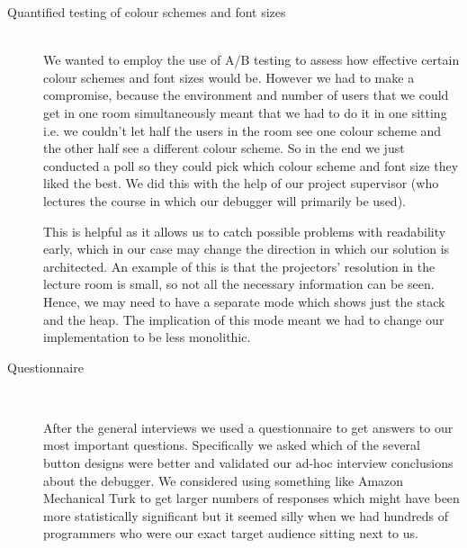 \documentclass[11pt, a4paper]{article}
\begin{document}
\begin{description}
\item[Quantified testing of colour schemes and font sizes] \hfill \\
We wanted to employ the use of A/B testing to assess how effective certain colour schemes and font sizes would be.
However we had to make a compromise, because the environment and number of users that we could get in one room simultaneously meant that we had to do it in one sitting i.e. we couldn’t let half the users in the room see one colour scheme and the other half see a different colour scheme.
So in the end we just conducted a poll so they could pick which colour scheme and font size they liked the best.
We did this with the help of our project supervisor (who lectures the course in which our debugger will primarily be used). 

This is helpful as it allows us to catch possible problems with readability early, which in our case may change the direction in which our solution is architected.
An example of this is that the projectors’ resolution in the lecture room is small, so not all the necessary information can be seen.
Hence, we may need to have a separate mode which shows just the stack and the heap.
The implication of this mode meant we had to change our implementation to be less monolithic.

\item[Questionnaire] \hfill \\
\begin{figure}[h!]
\centering
{}
\quad
{}
\end{figure}

After the general interviews we used a questionnaire to get answers to our most important questions.
Specifically we asked which of the several button designs were better and validated our ad-hoc interview conclusions about the debugger.
We considered using something like Amazon Mechanical Turk to get larger numbers of responses which might have been more statistically significant but it seemed silly when we had hundreds of programmers who were our exact target audience sitting next to us.
\end{description}
\end{document}
